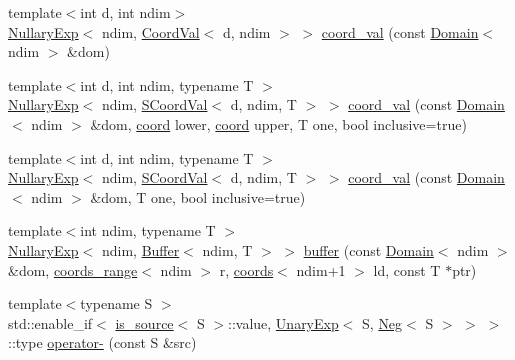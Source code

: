 \begin{DoxyCompactItemize}
{\footnotesize template$<$int d, int ndim$>$ }\\\hyperlink{classshark_1_1ndim_1_1_nullary_exp}{Nullary\+Exp}$<$ ndim, \hyperlink{classshark_1_1ndim_1_1_coord_val}{Coord\+Val}$<$ d, ndim $>$ $>$ \hyperlink{namespaceshark_1_1ndim_a599cfc303c9ba3f6fc3d6ddb2a13f541}{coord\+\_\+val} (const \hyperlink{classshark_1_1ndim_1_1_domain}{Domain}$<$ ndim $>$ \&dom)
\item 
{\footnotesize template$<$int d, int ndim, typename T $>$ }\\\hyperlink{classshark_1_1ndim_1_1_nullary_exp}{Nullary\+Exp}$<$ ndim, \hyperlink{classshark_1_1ndim_1_1_s_coord_val}{S\+Coord\+Val}$<$ d, ndim, T $>$ $>$ \hyperlink{namespaceshark_1_1ndim_a32dcb60d18d3a2fa6077d63ff7dcc60c}{coord\+\_\+val} (const \hyperlink{classshark_1_1ndim_1_1_domain}{Domain}$<$ ndim $>$ \&dom, \hyperlink{namespaceshark_a767a92d5dd82cb82266473bff42fa6d9}{coord} lower, \hyperlink{namespaceshark_a767a92d5dd82cb82266473bff42fa6d9}{coord} upper, T one, bool inclusive=true)
\item 
{\footnotesize template$<$int d, int ndim, typename T $>$ }\\\hyperlink{classshark_1_1ndim_1_1_nullary_exp}{Nullary\+Exp}$<$ ndim, \hyperlink{classshark_1_1ndim_1_1_s_coord_val}{S\+Coord\+Val}$<$ d, ndim, T $>$ $>$ \hyperlink{namespaceshark_1_1ndim_a31fe7dc4ac68fae53b8e49bac88d81fd}{coord\+\_\+val} (const \hyperlink{classshark_1_1ndim_1_1_domain}{Domain}$<$ ndim $>$ \&dom, T one, bool inclusive=true)
\item 
{\footnotesize template$<$int ndim, typename T $>$ }\\\hyperlink{classshark_1_1ndim_1_1_nullary_exp}{Nullary\+Exp}$<$ ndim, \hyperlink{classshark_1_1ndim_1_1_buffer}{Buffer}$<$ ndim, T $>$ $>$ \hyperlink{namespaceshark_1_1ndim_a18f6c04b5497740c4bea65b1a77f8797}{buffer} (const \hyperlink{classshark_1_1ndim_1_1_domain}{Domain}$<$ ndim $>$ \&dom, \hyperlink{structshark_1_1ndim_1_1coords__range}{coords\+\_\+range}$<$ ndim $>$ r, \hyperlink{structshark_1_1ndim_1_1coords}{coords}$<$ ndim+1 $>$ ld, const T $\ast$ptr)
\item 
{\footnotesize template$<$typename S $>$ }\\std\+::enable\+\_\+if$<$ \hyperlink{classshark_1_1ndim_1_1is__source}{is\+\_\+source}$<$ S $>$\+::value, \hyperlink{classshark_1_1ndim_1_1_unary_exp}{Unary\+Exp}$<$ S, \hyperlink{classshark_1_1ndim_1_1_neg}{Neg}$<$ S $>$ $>$ $>$\+::type \hyperlink{namespaceshark_1_1ndim_a7a89208e5b1e8bfe1486d3c44f0f4380}{operator-\/} (const S \&src)
\item 

\end{DoxyCompactItemize}
